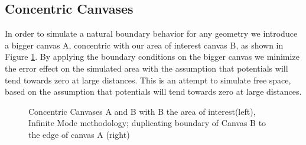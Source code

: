 \documentclass[a4paper]{article}
\begin{document}
\subsection{Concentric Canvases}

In order to simulate a natural boundary behavior for any geometry we introduce a bigger canvas A, concentric with our area of interest canvas B, as shown in Figure \ref{fig:canv}. By applying the boundary conditions on the bigger canvas we minimize the error effect on the simulated area with the assumption that potentials will tend towards zero at large distances. This is an attempt to simulate free space, based on the assumption that potentials will tend towards zero at large distances. \\

\begin{figure}[!h]
  \centering
  \hfill
  \caption{Concentric Canvases A and B with B the area of interest(left), Infinite Mode methodology; duplicating boundary of Canvas B to the edge of canvas A (right)}
\label{fig:canv}
\end{figure}
\end{document}
